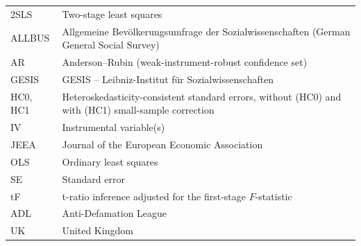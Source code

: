 \begin{tabular}{@{}p{}p{}@{}}
2SLS   & Two-stage least squares \\
ALLBUS & Allgemeine Bev\"olkerungsumfrage der Sozialwissenschaften (German General Social Survey) \\
AR     & Anderson--Rubin (weak-instrument-robust confidence set) \\
GESIS  & GESIS -- Leibniz-Institut f\"ur Sozialwissenschaften \\
HC0, HC1 & Heteroskedasticity-consistent standard errors, without (HC0) and with (HC1) small-sample correction \\
IV     & Instrumental variable(s) \\
JEEA   & Journal of the European Economic Association \\
OLS    & Ordinary least squares \\
SE     & Standard error \\
tF     & t-ratio inference adjusted for the first-stage $F$-statistic \citep{lee2022} \\
ADL    & Anti-Defamation League \\
UK     & United Kingdom \\
\end{tabular}
